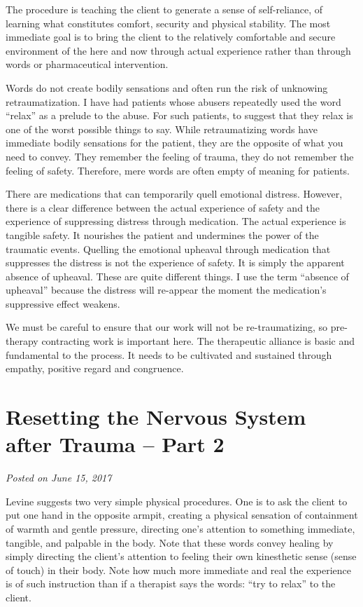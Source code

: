 \documentclass[]{book}
\begin{document}
The procedure is teaching the client to generate a sense of self-reliance, of learning what constitutes comfort, security and physical stability. The most immediate goal is to bring the client to the relatively comfortable and secure environment of the here and now through actual experience rather than through words or pharmaceutical intervention.

Words do not create bodily sensations and often run the risk of unknowing retraumatization. I have had patients whose abusers repeatedly used the word ``relax'' as a prelude to the abuse. For such patients, to suggest that they relax is one of the worst possible things to say. While retraumatizing words have immediate bodily sensations for the patient, they are the opposite of what you need to convey. They remember the feeling of trauma, they do not remember the feeling of safety. Therefore, mere words are often empty of meaning for patients.

There are medications that can temporarily quell emotional distress. However, there is a clear difference between the actual experience of safety and the experience of suppressing distress through medication. The actual experience is tangible safety. It nourishes the patient and undermines the power of the traumatic events. Quelling the emotional upheaval through medication that suppresses the distress is not the experience of safety. It is simply the apparent absence of upheaval. These are quite different things. I use the term ``absence of upheaval'' because the distress will re-appear the moment the medication's suppressive effect weakens.

We must be careful to ensure that our work will not be re-traumatizing, so pre-therapy contracting work is important here. The therapeutic alliance is basic and fundamental to the process. It needs to be cultivated and sustained through empathy, positive regard and congruence.

\hypertarget{resetting-the-nervous-system-after-trauma-part-2}{%
\section{Resetting the Nervous System after Trauma -- Part 2}\label{resetting-the-nervous-system-after-trauma-part-2}}

\emph{Posted on June 15, 2017}

Levine suggests two very simple physical procedures. One is to ask the client to put one hand in the opposite armpit, creating a physical sensation of containment of warmth and gentle pressure, directing one's attention to something immediate, tangible, and palpable in the body. Note that these words convey healing by simply directing the client's attention to feeling their own kinesthetic sense (sense of touch) in their body. Note how much more immediate and real the experience is of such instruction than if a therapist says the words: ``try to relax'' to the client.
\end{document}
